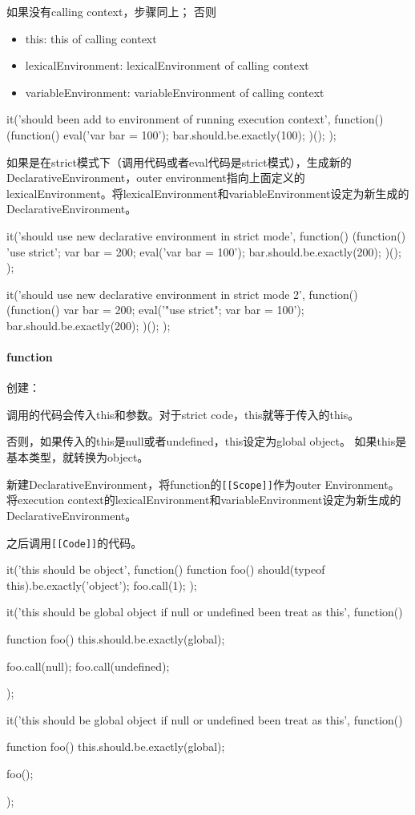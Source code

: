 如果没有calling context，步骤同上；
否则
\begin{itemize}
\item this: this of calling context
\item lexicalEnvironment: lexicalEnvironment of calling context
\item variableEnvironment: variableEnvironment of calling context
\end{itemize}
\begin{JavaScript}
		it('should been add to environment of running execution context', function(){
			(function(){
				eval('var bar = 100');
				bar.should.be.exactly(100);
			})();
		});
\end{JavaScript}
如果是在strict模式下（调用代码或者eval代码是strict模式），生成新的DeclarativeEnvironment，outer environment指向上面定义的lexicalEnvironment。将lexicalEnvironment和variableEnvironment设定为新生成的DeclarativeEnvironment。
\begin{JavaScript}
		it('should use new declarative environment in strict mode', function(){
			(function(){
				'use strict';
				var bar = 200;
				eval('var bar = 100');
				bar.should.be.exactly(200);
			})();
		});

		it('should use new declarative environment in strict mode 2', function(){
			(function(){
				var bar = 200;
				eval('"use strict"; var bar = 100');
				bar.should.be.exactly(200);
			})();
		});
\end{JavaScript}
\paragraph{function}
创建：

调用的代码会传入this和参数。对于strict code，this就等于传入的this。

否则，如果传入的this是null或者undefined，this设定为global object。
如果this是基本类型，就转换为object。

新建DeclarativeEnvironment，将function的\lstinline![[Scope]]!作为outer Environment。将execution context的lexicalEnvironment和variableEnvironment设定为新生成的DeclarativeEnvironment。

之后调用\lstinline![[Code]]!的代码。

\begin{JavaScript}[this是object]
		it('this should be object', function(){
			function foo(){
				should(typeof this).be.exactly('object');
			}
			foo.call(1);
		});
\end{JavaScript}

\begin{JavaScript}
		it('this should be global object if null or undefined been treat as this', function(){
			function foo(){
				this.should.be.exactly(global);
			}

			foo.call(null);
			foo.call(undefined);
		});

		it('this should be global object if null or undefined been treat as this', function(){
			function foo(){
				this.should.be.exactly(global);
			}

			foo();
		});
\end{JavaScript}

